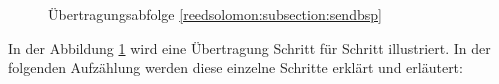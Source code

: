 \begin{figure}%
	\centering
	\caption{Übertragungsabfolge \ref{reedsolomon:subsection:sendbsp}}
	\label{fig:sendorder}
\end{figure}
In der Abbildung \ref{fig:sendorder} wird eine Übertragung Schritt für Schritt illustriert.
In der folgenden Aufzählung werden diese einzelne Schritte erklärt und erläutert:
